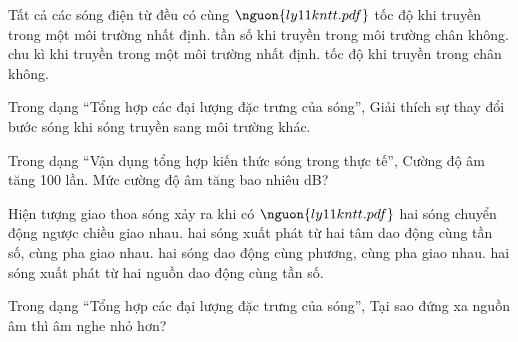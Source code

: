 \begin{ex}
Tất cả các sóng điện từ đều có cùng $\nguon{ly11 kntt.pdf}$
\choice
{tốc độ khi truyền trong một môi trường nhất định.}
{tần số khi truyền trong môi trường chân không.}
{chu kì khi truyền trong một môi trường nhất định.}
{\True tốc độ khi truyền trong chân không.}
\end{ex}

\begin{ex}
Trong dạng “Tổng hợp các đại lượng đặc trưng của sóng”, Giải thích sự thay đổi bước sóng khi sóng truyền sang môi trường khác.
\choiceTF

\end{ex}

\begin{ex}
Trong dạng “Vận dụng tổng hợp kiến thức sóng trong thực tế”, Cường độ âm tăng 100 lần. Mức cường độ âm tăng bao nhiêu dB?
\end{ex}

\begin{ex}
Hiện tượng giao thoa sóng xảy ra khi có $\nguon{ly11 kntt.pdf}$
\choice
{hai sóng chuyển động ngược chiều giao nhau.}
{\True hai sóng xuất phát từ hai tâm dao động cùng tần số, cùng pha giao nhau.}
{hai sóng dao động cùng phương, cùng pha giao nhau.}
{hai sóng xuất phát từ hai nguồn dao động cùng tần số.}
\end{ex}

\begin{ex}
Trong dạng “Tổng hợp các đại lượng đặc trưng của sóng”, Tại sao đứng xa nguồn âm thì âm nghe nhỏ hơn?
\choiceTF

\end{ex}

